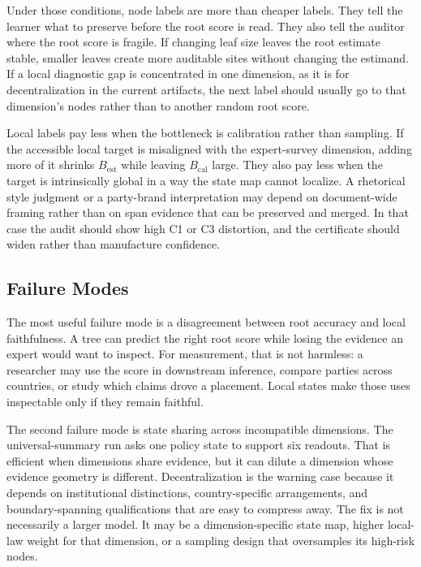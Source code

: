 Under those conditions, node labels are more than cheaper labels. They tell the
learner what to preserve before the root score is read. They also tell the
auditor where the root score is fragile. If changing leaf size leaves the root
estimate stable, smaller leaves create more auditable sites without changing
the estimand. If a local diagnostic gap is concentrated in one dimension, as it
is for decentralization in the current artifacts, the next label should usually
go to that dimension's nodes rather than to another random root score.

Local labels pay less when the bottleneck is calibration rather than sampling.
If the accessible local target is misaligned with the expert-survey dimension,
adding more of it shrinks \(B_{\mathrm{est}}\) while leaving
\(B_{\mathrm{cal}}\) large. They also pay less when the target is intrinsically
global in a way the state map cannot localize. A rhetorical style judgment or a
party-brand interpretation may depend on document-wide framing rather than on
span evidence that can be preserved and merged. In that case the audit should
show high C1 or C3 distortion, and the certificate should widen rather than
manufacture confidence.

\subsection{Failure Modes}

The most useful failure mode is a disagreement between root accuracy and local
faithfulness. A tree can predict the right root score while losing the evidence
an expert would want to inspect. For measurement, that is not harmless: a
researcher may use the score in downstream inference, compare parties across
countries, or study which claims drove a placement. Local states make those
uses inspectable only if they remain faithful.

The second failure mode is state sharing across incompatible dimensions. The
universal-summary run asks one policy state to support six readouts. That is
efficient when dimensions share evidence, but it can dilute a dimension whose
evidence geometry is different. Decentralization is the warning case because it
depends on institutional distinctions, country-specific arrangements, and
boundary-spanning qualifications that are easy to compress away. The fix is not
necessarily a larger model. It may be a dimension-specific state map, higher
local-law weight for that dimension, or a sampling design that oversamples its
high-risk nodes.

